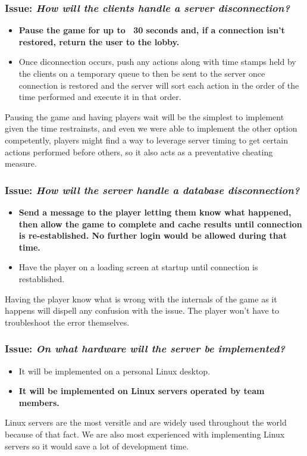\subsubsection*{Issue: \textit{How will the clients handle a server disconnection?}}

  \begin{itemize}
    \item \textbf{Pause the game for up to ~30 seconds and, if a connection isn't restored, return the user to the lobby.}
    \item Once diconnection occurs, push any actions along with time stamps held by the clients on a temporary queue to then be sent to the server once connection is restored and the server will sort each action in the order of the time performed and execute it in that order. 
  \end{itemize}

Pausing the game and having players wait will be the simplest to implement given the time restrainsts, and even we were able to implement the other option competently, players might find a way to leverage server timing to get certain actions performed before others, so it also acts as a preventative cheating measure.

\subsubsection*{Issue: \textit{How will the server handle a database disconnection?}}

  \begin{itemize}
    \item \textbf{Send a message to the player letting them know what happened, then allow the game to complete and cache results until connection is re-established. No further login would be allowed during that time.}
    \item Have the player on a loading screen at startup until connection is restablished.
  \end{itemize}

Having the player know what is wrong with the internals of the game as it happens will dispell any confusion with the issue. The player won't have to troubleshoot the error themselves.

\subsubsection*{Issue: \textit{On what hardware will the server be implemented?}}

  \begin{itemize}
    \item It will be implemented on a personal Linux desktop.
    \item \textbf{It will be implemented on Linux servers operated by team members.}
  \end{itemize}

Linux servers are the most versitle and are widely used throughout the world because of that fact. We are also most experienced with implementing Linux servers so it would save a lot of development time.
